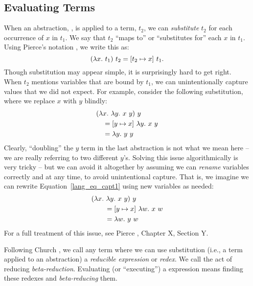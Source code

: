 \documentclass[12pt]{report}
\begin{document}
\subsection{Evaluating \LamA Terms}
\label{lang_sec1_eval}

When an abstraction, , is applied to a term, $t_2$, we
can \emph{substitute} $t_2$ for each occurrence of $x$ in $t_1$. We say
that $t_2$ ``maps to'' or ``substitutes for'' each $x$ in $t_1$. Using
Pierce's notation \citep{PierceXX}, we write this as:
\begin{equation}
  \lamAppP{\lamAbs{x}{t_1}}{t_2} = [t_2 \mapsto x]\ t_1.
\end{equation}
Though substitution may appear simple, it is surprisingly hard to get
right. When $t_2$ mentions variables that are bound by $t_1$, we can
unintentionally capture values that we did not expect. For example,
consider the following substitution, where we replace $x$ with $y$
blindly:
\begin{equation}
  \begin{split}
    & (\lambda x.\ \lambda y.\ x\ y)\ y \\
    & \quad = [y \mapsto x]\ \lambda y.\ x\ y \\
    & \quad = \lambda y.\ y\ y
  \end{split}
\label{lang_eq_capt1}
\end{equation}
Clearly, ``doubling'' the $y$ term in the last abstraction is not what
we mean here -- we are really referring to two different
$y$'s. Solving this issue algorithmically is very tricky -- but we can
avoid it altogether by assuming we can \emph{rename} variables
correctly and at any time, to avoid unintentional capture. That is, we
imagine we can rewrite Equation~\ref{lang_eq_capt1} using new
variables as needed:
\begin{equation}
  \begin{split}
    & (\lambda x.\ \lambda y.\ x\ y)\ y \\
    & \qquad = [y \mapsto x]\ \lambda w.\ x\ w \\
    & \qquad = \lambda w.\ y\ w
  \end{split}
\label{lang_eq_capt2}
\end{equation}
For a full treatment of this issue, see Pierce \citep{PierceXX},
Chapter X, Section Y.

Following Church
\citep{ChurchXX}, we call any term where we can use substitution
(i.e., a term applied to an abstraction) a \emph{reducible expression}
or \emph{redex}. We call the act of reducing
\emph{beta-reduction}. Evaluating (or ``executing'') a \lamA
expression means finding these redexes and \emph{beta-reducing} them.
\end{document}
